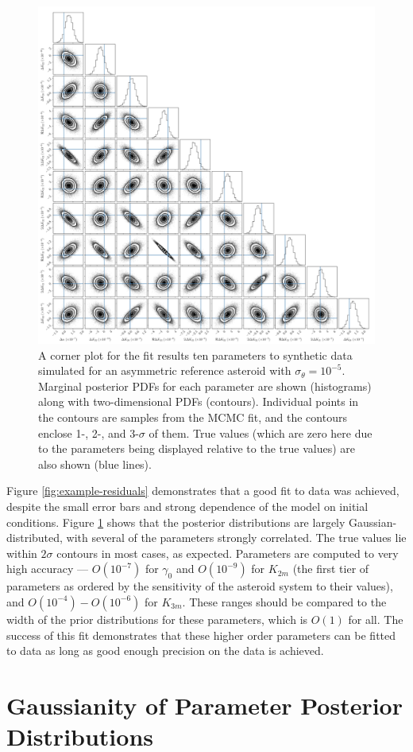 \documentclass{aastex631}
\begin{document}
\begin{figure}
  \centering
  \includegraphics[width=\textwidth]{example-corner.pdf}
  \caption{A corner plot for the fit results ten parameters to synthetic data simulated for an asymmetric reference asteroid with $\sigma_\theta = 10^{-5}$. Marginal posterior PDFs for each parameter are shown (histograms) along with two-dimensional PDFs (contours). Individual points in the contours are samples from the MCMC fit, and the contours enclose 1-, 2-, and 3-$\sigma$ of them. True values (which are zero here due to the parameters being displayed relative to the true values) are also shown (blue lines).}
  \label{fig:example-corner}
\end{figure}

Figure \ref{fig:example-residuals} demonstrates that a good fit to data was achieved, despite the small error bars and strong dependence of the model on initial conditions. Figure \ref{fig:example-corner} shows that the posterior distributions are largely Gaussian-distributed, with several of the parameters strongly correlated. The true values lie within $2\sigma$ contours in most cases, as expected. Parameters are computed to very high accuracy --- $O(10^{-7})$ for $\gamma_0$ and $O(10^{-9})$ for $K_{2m}$ (the first tier of parameters as ordered by the sensitivity of the asteroid system to their values), and $O(10^{-4})-O(10^{-6})$ for $K_{3m}$. These ranges should be compared to the width of the prior distributions for these parameters, which is $O(1)$ for all. The success of this fit demonstrates that these higher order parameters can be fitted to data as long as good enough precision on the data is achieved.



\section{Gaussianity of Parameter Posterior Distributions}
\label{app:gaussian-posteriors}



{}

\end{document}

